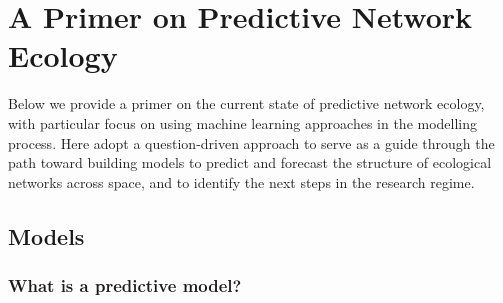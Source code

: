 \documentclass[11pt]{article}
\begin{document}
\hypertarget{a-primer-on-predictive-network-ecology}{%
\section{A Primer on Predictive Network
Ecology}\label{a-primer-on-predictive-network-ecology}}

Below we provide a primer on the current state of predictive network
ecology, with particular focus on using machine learning approaches in
the modelling process. Here adopt a question-driven approach to serve as
a guide through the path toward building models to predict and forecast
the structure of ecological networks across space, and to identify the
next steps in the research regime.

\hypertarget{models}{%
\subsection{Models}\label{models}}

\hypertarget{what-is-a-predictive-model}{%
\subsubsection{What is a predictive
model?}\label{what-is-a-predictive-model}}
\end{document}
